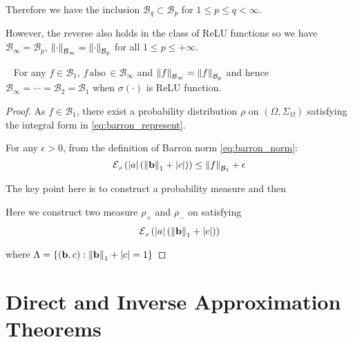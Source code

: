 Therefore we have the inclusion $\mathcal{B}_{q} \subset \mathcal{B}_p$
for $1 \leq p \leq q < \infty$. 

However, the reverse also holds in the class of ReLU functions so we have $\mathcal{B}_{\infty} = 
\mathcal{B}_p$, $\left\lVert\cdot\right\rVert_{\mathcal{B}_\infty} = \left\lVert\cdot\right\rVert_{\mathcal{B}_p}$  for all $1 \leq p \leq +\infty$.

\begin{lemma}\label{lamma:equivalence_barron_space} ~\cite[Prop. 10]{eBarronSpaceFlowinduced2021}
    For any $f \in \mathcal{B}_1$, $f \,\text{also}\, \in \mathcal{B}_{\infty}$ and 
    $\left\lVert f\right\rVert_{\mathcal{B}_\infty} = \left\lVert f\right\rVert_{\mathcal{B}_p}$ and 
    hence $ \mathcal{B}_{\infty} = \cdots = \mathcal{B}_{2} = \mathcal{B}_1$ when $\sigma(\cdot)$ 
    is ReLU function.
\end{lemma}

\begin{proof}
    As $f \in \mathcal{B}_1$,  there exist 
    a probability distribution $\rho$ on $(\Omega, \Sigma_\Omega)$ satisfying the integral form in \eqref{eq:barron_represent}.

    For any $\epsilon > 0$, from the definition of Barron norm \eqref{eq:barron_norm}:
    \begin{equation}
        \ERWi{\rho}{\abs{a}(\norm{\mathbf{b}}_1 + \abs{c})} \leq \barronnorm{f}{1} + \epsilon
    \end{equation}


    The key point here is to construct a probability measure and then 

    Here we construct two measure $\rho_+$ and $\rho_-$ on satisfying 
    \begin{equation*}
        \ERWi{\rho}{\abs{a}(\norm{\mathbf{b}}_1 + \abs{c})}
    \end{equation*}
    
    
    where $\Lambda = \{(\mathbf{b}, c): \left\| \mathbf{b} \right\|_1 + \left| c \right| = 1\}$
\end{proof}

\section{Direct and Inverse Approximation Theorems}

